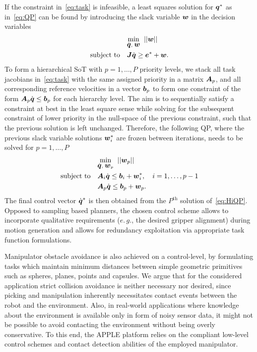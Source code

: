 If the constraint in~\eqref{eq:task} is infeasible, a least squares solution for $\mbox{\boldmath $q$}^*$ as
in~\eqref{eq:QP} can be found by introducing the slack variable $\mbox{\boldmath $w$}$ in the decision variables
%
\begin{align}\label{eq:iQP}
  &\underset{\dot{\mbox{\boldmath $q$}},\;\mbox{\boldmath $w$}}{\mbox{min}}\;\;||\mbox{\boldmath $w$}||\\
   \mbox{subject to} \quad &\mbox{\boldmath $J$}\dot{\mbox{\boldmath $q$}} \geq \mbox{\boldmath $e$}^* + \mbox{\boldmath $w$}. \nonumber
\end{align}
%
To form a hierarchical SoT with $p=1,\dots,P$ priority levels, we stack all task jacobians
in~\eqref{eq:task} with the same assigned priority in a matrix $\mbox{\boldmath $A$}_p$, and all corresponding
reference velocities in a vector $\mbox{\boldmath $b$}_p$ to form one constraint of the form
$\mbox{\boldmath $A$}_p\dot{\mbox{\boldmath $q$}}\leq \mbox{\boldmath $b$}_p$ for each hierarchy level. The aim is to sequentially satisfy
a constraint at best in the least square sense while solving for the subsequent constraint of lower
priority in the null-space of the previous constraint, such that the previous solution is left
unchanged. Therefore, the following QP, where the previous slack variable solutions $\mbox{\boldmath $w$}_i^*$
are frozen between iterations, needs to be solved for $p=1,\ldots,P$
%
\begin{align}\label{eq:HiQP}
  &\underset{\dot{\mbox{\boldmath $q$}},\;\mbox{\boldmath $w$}_p}{\mbox{min}}\;\;||\mbox{\boldmath $w$}_p||\\
   \mbox{subject to} \quad &\mbox{\boldmath $A$}_i\dot{\mbox{\boldmath $q$}} \leq \mbox{\boldmath $b$}_i + \mbox{\boldmath $w$}_i^*, \quad i=1,\dots,p-1 \nonumber \\
                           &\mbox{\boldmath $A$}_p\dot{\mbox{\boldmath $q$}} \leq \mbox{\boldmath $b$}_p + \mbox{\boldmath $w$}_p.  \nonumber 
\end{align}
%
The final control vector $\dot{\mbox{\boldmath $q$}}^*$ is then obtained from the $P^{\mbox{th}}$ solution
of~\eqref{eq:HiQP}. Opposed to sampling based planners, the chosen control scheme allows to
incorporate qualitative requirements ($e.\,g.$, the desired gripper alignment) during motion
generation and allows for redundancy exploitation via appropriate task function formulations.

Manipulator obstacle avoidance is also achieved on a control-level, by formulating tasks which
maintain minimum distances between simple geometric primitives such as spheres, planes, points and
capsules. We argue that for the considered application strict collision avoidance is neither
necessary nor desired, since picking and manipulation inherently necessitates contact events between
the robot and the environment. Also, in real-world applications where knowledge about the
environment is available only in form of noisy sensor data, it might not be possible to avoid
contacting the environment without being overly conservative. To this end, the APPLE platform relies
on the compliant low-level control schemes and contact detection abilities of the employed
manipulator.
%
